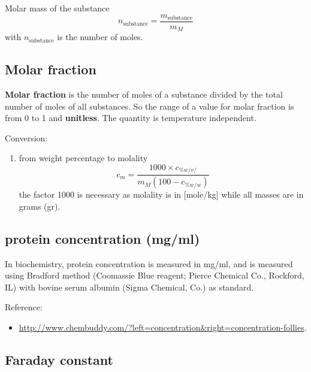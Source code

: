 \begin{framed}
  Molar mass of the substance
  \begin{equation}
    \label{eq:1005}
    n_\text{substance} = \frac{m_\text{substance}}{m_M}
  \end{equation}
with $n_\text{substance}$ is the number of moles. 
\end{framed}

\subsection{Molar fraction}
\label{sec:concentration-molar-fraction}

{\bf Molar fraction} is the number of moles of a substance divided by
the total number of moles of all substances. So the range of a value for molar
fraction is from 0 to 1 and {\bf unitless}. The quantity is temperature
independent.

Conversion:
\begin{enumerate}
\item from weight percentage to molality 
  \begin{equation}
    \label{eq:1004}
    c_m = \frac{1000\times c_{\% w/v/}}{m_M(100-c_{\% w/w})}
  \end{equation}
the factor 1000 is necessary as molality is in [mole/kg] while all
masses are in grams (gr). 
\end{enumerate}

\subsection{protein concentration (mg/ml)}
\label{sec:concentration-protein}


In biochemistry, protein concentration is measured in mg/ml, and is measured
using Bradford method (Coomassie Blue reagent; Pierce Chemical
Co., Rockford, IL) with bovine serum albumin (Sigma Chemical, Co.) as standard. 

Reference:
\begin{itemize}
\item \url{http://www.chembuddy.com/?left=concentration&right=concentration-follies}.  
\end{itemize}


\subsection{Faraday constant}
\label{sec:Faraday-constant}

